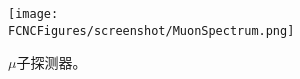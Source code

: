 \begin{figure}[htb]
\centering
\texttt{[image: \\FCNCFigures/screenshot/MuonSpectrum.png]}
\caption{$\mu$子探测器。}
\label{fig:MuonSpectrum}
\end{figure}